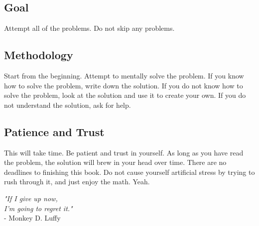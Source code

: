 \subsection*{Goal}
Attempt all of the problems. Do not skip any problems.

\subsection*{Methodology}
Start from the beginning. Attempt to mentally solve the problem. If you know how to solve the problem, write down the solution. If you do not know how to solve the problem, look at the solution and use it to create your own. If you do not understand the solution, ask for help.

\subsection*{Patience and Trust}
This will take time. Be patient and trust in yourself. As long as you have read the problem, the solution will brew in your head over time. There are no deadlines to finishing this book. Do not cause yourself artificial stress by trying to rush through it, and just enjoy the math. Yeah.


\vspace{2cm}
\begin{center}
    \textit{"If I give up now, }\\
    \textit{I’m going to regret it."} \\[5mm]
    - Monkey D. Luffy
\end{center}